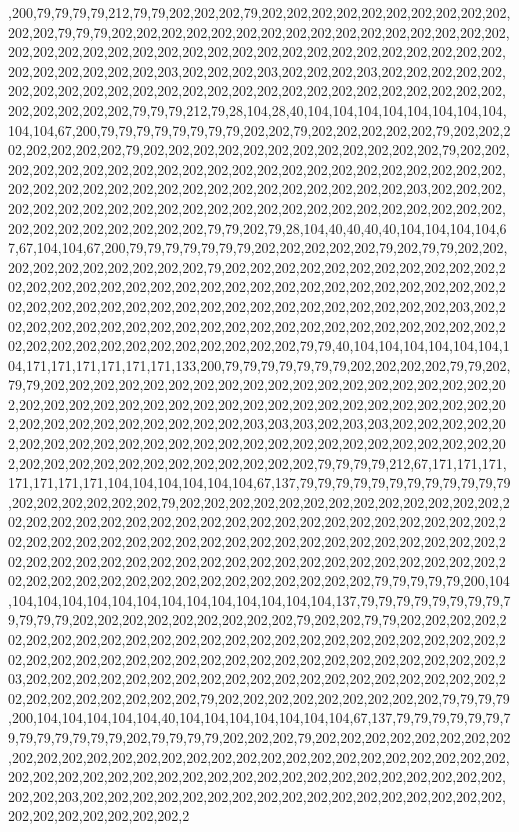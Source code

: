 ,200,79,79,79,79,212,79,79,202,202,202,79,202,202,202,202,202,202,202,202,202,202,202,202,79,79,79,202,202,202,202,202,202,202,202,202,202,202,202,202,202,202,202,202,202,202,202,202,202,202,202,202,202,202,202,202,202,202,202,202,202,202,202,202,202,202,202,202,202,203,202,202,202,203,202,202,202,203,202,202,202,202,202,202,202,202,202,202,202,202,202,202,202,202,202,202,202,202,202,202,202,202,202,202,202,202,202,202,79,79,79,212,79,28,104,28,40,104,104,104,104,104,104,104,104,104,104,67,200,79,79,79,79,79,79,79,79,202,202,79,202,202,202,202,202,79,202,202,202,202,202,202,202,79,202,202,202,202,202,202,202,202,202,202,202,202,79,202,202,202,202,202,202,202,202,202,202,202,202,202,202,202,202,202,202,202,202,202,202,202,202,202,202,202,202,202,202,202,202,202,202,202,202,202,202,203,202,202,202,202,202,202,202,202,202,202,202,202,202,202,202,202,202,202,202,202,202,202,202,202,202,202,202,202,202,202,202,79,79,202,79,28,104,40,40,40,40,104,104,104,104,67,67,104,104,67,200,79,79,79,79,79,79,79,202,202,202,202,202,79,202,79,79,202,202,202,202,202,202,202,202,202,202,79,202,202,202,202,202,202,202,202,202,202,202,202,202,202,202,202,202,202,202,202,202,202,202,202,202,202,202,202,202,202,202,202,202,202,202,202,202,202,202,202,202,202,202,202,202,202,202,202,202,203,202,202,202,202,202,202,202,202,202,202,202,202,202,202,202,202,202,202,202,202,202,202,202,202,202,202,202,202,202,202,202,202,202,79,79,40,104,104,104,104,104,104,104,171,171,171,171,171,171,133,200,79,79,79,79,79,79,79,202,202,202,202,79,79,202,79,79,202,202,202,202,202,202,202,202,202,202,202,202,202,202,202,202,202,202,202,202,202,202,202,202,202,202,202,202,202,202,202,202,202,202,202,202,202,202,202,202,202,202,202,202,202,202,202,202,203,203,203,202,203,203,202,202,202,202,202,202,202,202,202,202,202,202,202,202,202,202,202,202,202,202,202,202,202,202,202,202,202,202,202,202,202,202,202,202,202,202,202,79,79,79,79,212,67,171,171,171,171,171,171,171,104,104,104,104,104,104,67,137,79,79,79,79,79,79,79,79,79,79,79,79,202,202,202,202,202,202,79,202,202,202,202,202,202,202,202,202,202,202,202,202,202,202,202,202,202,202,202,202,202,202,202,202,202,202,202,202,202,202,202,202,202,202,202,202,202,202,202,202,202,202,202,202,202,202,202,202,202,202,202,202,202,202,202,202,202,202,202,202,202,202,202,202,202,202,202,202,202,202,202,202,202,202,202,202,202,202,202,202,202,202,202,202,202,202,202,79,79,79,79,79,200,104,104,104,104,104,104,104,104,104,104,104,104,104,104,137,79,79,79,79,79,79,79,79,79,79,79,79,202,202,202,202,202,202,202,202,202,79,202,202,79,79,202,202,202,202,202,202,202,202,202,202,202,202,202,202,202,202,202,202,202,202,202,202,202,202,202,202,202,202,202,202,202,202,202,202,202,202,202,202,202,202,202,202,202,202,203,202,202,202,202,202,202,202,202,202,202,202,202,202,202,202,202,202,202,202,202,202,202,202,202,202,202,202,79,202,202,202,202,202,202,202,202,202,79,79,79,79,200,104,104,104,104,104,40,104,104,104,104,104,104,104,67,137,79,79,79,79,79,79,79,79,79,79,79,79,79,202,79,79,79,79,202,202,202,79,202,202,202,202,202,202,202,202,202,202,202,202,202,202,202,202,202,202,202,202,202,202,202,202,202,202,202,202,202,202,202,202,202,202,202,202,202,202,202,202,202,202,202,202,202,202,202,202,202,202,203,202,202,202,202,202,202,202,202,202,202,202,202,202,202,202,202,202,202,202,202,202,202,202,202,2